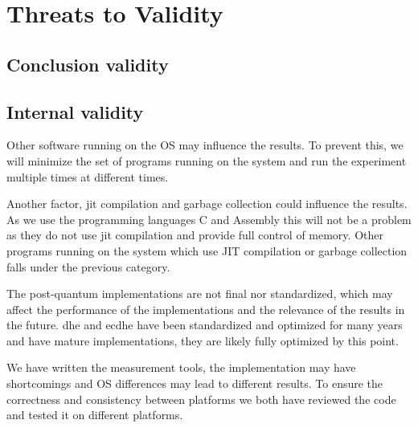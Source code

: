 \section{Threats to Validity}


\subsection{Conclusion validity}


\subsection{Internal validity}
\label{section:method:internal-validity}
Other software running on the OS may influence the results. To prevent this, we will minimize the set of programs running on the system and run the experiment multiple times at different times.

Another factor, \gls{jit} compilation and garbage collection could influence the results. As we use the programming languages C and Assembly this will not be a problem as they do not use \gls{jit} compilation and provide full control of memory. Other programs running on the system which use JIT compilation or garbage collection falls under the previous category.




The post-quantum implementations are not final nor standardized, which may affect the performance of the implementations and the relevance of the results in the future. \gls{dhe} and \gls{ecdhe} have been standardized and optimized for many years and have mature implementations, they are likely fully optimized by this point.

We have written the measurement tools, the implementation may have shortcomings and OS differences may lead to different results. To ensure the correctness and consistency between platforms we both have reviewed the code and tested it on different platforms.

